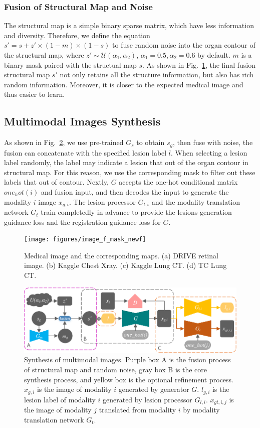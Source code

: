 \documentclass[runningheads]{llncs}
\begin{document}
	\subsubsection{Fusion of Structural Map and Noise}	
	The structural map is a simple binary sparse matrix, which have less information and diversity. Therefore, we define the equation $s'=s+z'\times(1-m)\times(1-s)$ to fuse random noise into the organ contour of the structural map, where $z'\sim\mathcal{U}(\alpha_1,\alpha_2)$, $\alpha_1 =0.5,\alpha_2=0.6$ by default. $m$ is a binary mask paired with the structual map $s$. As shown in Fig.~\ref{image_and_f}, the final fusion structural map $s'$ not only retains all the structure information, but also has rich random information. Moreover, it is closer to the expected medical image and thus easier to learn. 	
	\subsection{Multimodal Images Synthesis}
	As shown in Fig.~\ref{mm_mri_generate}, we use pre-trained $G_s$ to obtain $s_g$, then fuse with noise, the fusion can concatenate with the specified lesion label $l$. When selecting a lesion label randomly, the label may indicate a lesion that out of the organ contour in structural map. For this reason, we use the corresponding mask to filter out these labels that out of contour. Nextly, $G$ accepts the one-hot conditional matrix $one_hot(i)$ and fusion input, and then decodes the input to generate the modality $i$ image $x_{g,i}$. The lesion processor $G_{l,i}$ and the modality translation network $G_t$ train completedly in advance to provide the lesions generation guidance loss and the registration guidance loss for $G$.
	\begin{figure}[th]
		\centering
		\texttt{[image: figures/image\_f\_mask\_newf]}
		\caption{Medical image and the corresponding maps. (a) DRIVE retinal image. (b) Kaggle Chest Xray. (c) Kaggle Lung CT. (d) TC Lung CT.}
		\label{image_and_f}
	\end{figure}
	\begin{figure}[th]
		\centering
		\includegraphics[width=1\columnwidth]{figures/mm_mri_generate_train}
		\caption{Synthesis of multimodal images. Purple box A is the fusion process of structural map and random noise, gray box B is the core synthesis process, and yellow box is the optional refinement process. 
			$x_{g,i}$ is the image of modality $i$ generated by generator $G$. 
			$l_{g,i}$ is the lesion label of modality $i$ generated by lesion processor $G_{l,i}$.
			$x_{gt,i,j}$ is the image of modality $j$ translated from modality $i$ by modality translation network $G_t$.
		}
		\label{mm_mri_generate}
	\end{figure}
\end{document}
